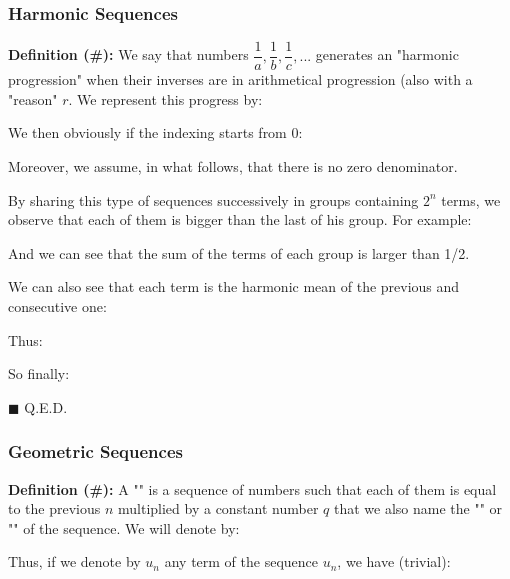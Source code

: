 	\subsubsection{Harmonic Sequences}
	\textbf{Definition (\#\mydef):} We say that numbers $\dfrac{1}{a}, \dfrac{1}{b}, \dfrac{1}{c},...$ generates an "harmonic progression" when their inverses are in arithmetical progression (also with a "reason" $r$. We represent this progress by:
	
We then obviously if the indexing starts from 0:
	
Moreover, we assume, in what follows, that there is no zero denominator.

By sharing this type of sequences successively in groups containing $2^n$ terms, we observe that each of them is bigger than the last of his group. For example:
	
And we can see that the sum of the terms of each group is larger than 1/2.

We can also see that each term is the harmonic mean of the previous and consecutive one:

\begin{dem}
	
Thus:
	
So finally:
		
	\begin{flushright}
		$\blacksquare$  Q.E.D.
	\end{flushright}
\end{dem}

	\subsubsection{Geometric Sequences}
\textbf{Definition (\#\mydef):} A "\label{geometric sequence}" is a sequence of numbers such that each of them is equal to the previous $n$ multiplied by a constant number $q$ that we also name the "" or "" of the sequence. We will denote by:
	
Thus, if we denote by $u_n$ any term of the sequence $u_n$, we have (trivial):
	
